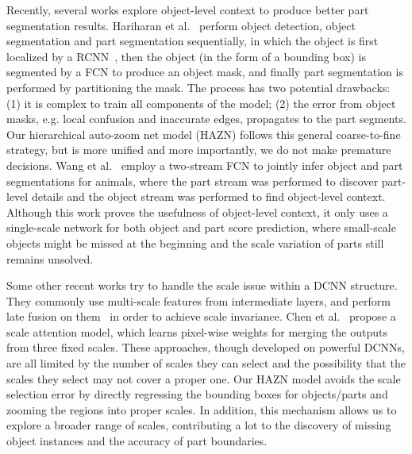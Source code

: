 Recently, several works explore object-level context to produce better part segmentation results.
Hariharan et al.~\cite{hariharan2015hypercolumns} perform object detection, object segmentation and part segmentation sequentially, in which the object is first localized by a RCNN~\cite{girshick2014rich}, then the object (in the form of a bounding box) is segmented by a FCN to produce an object mask, and finally part segmentation is performed by partitioning the mask. The process has two potential drawbacks: (1) it is complex to train all components of the model; (2) the error from object masks, e.g. local confusion and inaccurate edges, propagates to the part segments.
Our hierarchical auto-zoom net model (HAZN) follows this general coarse-to-fine strategy, but is more unified and more importantly, we do not make premature decisions.
Wang et al.~\cite{wang2015joint} employ a two-stream FCN to jointly infer object and part segmentations for animals, where the part stream was performed to discover part-level details and the object stream was performed to find object-level context.
Although this work proves the usefulness of object-level context, it only uses a single-scale network for both object and part score prediction, where small-scale objects might be missed at the beginning and the scale variation of parts still remains unsolved.

Some other recent works try to handle the scale issue within a DCNN structure.
They commonly use multi-scale features from intermediate layers, and perform late fusion on them~\cite{long2015fully,hariharan2015hypercolumns,chen2016deeplab} in order to achieve scale invariance. Chen et al.~\cite{chen2016attention} propose a scale attention model, which learns pixel-wise weights for merging the outputs from three fixed scales.
These approaches, though developed on powerful DCNNs, are all limited by the number of scales they can select and the possibility that the scales they select may not cover a proper one. Our HAZN model avoids the scale selection error by directly regressing the bounding boxes for objects/parts and zooming the regions into proper scales.
In addition, this mechanism allows us to explore a broader range of scales, contributing a lot to the discovery of missing object instances and the accuracy of part boundaries.

